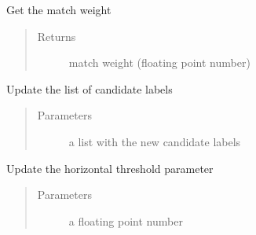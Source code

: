 \documentclass[letterpaper,10pt,english]{sphinxmanual}
\begin{document}
\begin{fulllineitems}
\begin{fulllineitems}
\end{fulllineitems}


\begin{fulllineitems}
\label{\detokenize{customParameters:objects.customParameters.customParameters.getMatchWeight}}
Get the match weight
\begin{quote}\begin{description}
\item[{Returns}] \leavevmode
match weight (floating point number)

\end{description}\end{quote}

\end{fulllineitems}


\begin{fulllineitems}
\label{\detokenize{customParameters:objects.customParameters.customParameters.setcandidateLabels}}
Update the list of candidate labels
\begin{quote}\begin{description}
\item[{Parameters}] \leavevmode
{} \textendash{} a list with the new candidate labels

\end{description}\end{quote}

\end{fulllineitems}


\begin{fulllineitems}
\label{\detokenize{customParameters:objects.customParameters.customParameters.setHorizontalThreshold}}
Update the horizontal threshold parameter
\begin{quote}\begin{description}
\item[{Parameters}] \leavevmode
{} \textendash{} a floating point number


\end{description}
\end{quote}
\end{fulllineitems}
\end{fulllineitems}
\end{document}
